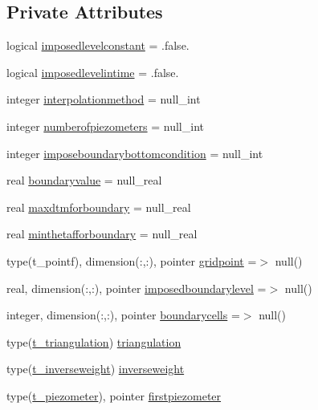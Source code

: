 \subsection*{Private Attributes}
\begin{DoxyCompactItemize}
\item 
logical \mbox{\hyperlink{structmoduleporousmedia_1_1t__boundary_a699d4d92d04b76dea647dcc070d5a6fc}{imposedlevelconstant}} = .false.
\item 
logical \mbox{\hyperlink{structmoduleporousmedia_1_1t__boundary_a0fe61c0ecad1296da9352c91b389c5e1}{imposedlevelintime}} = .false.
\item 
integer \mbox{\hyperlink{structmoduleporousmedia_1_1t__boundary_accf41c318c0bfe37d100ef60752848ed}{interpolationmethod}} = null\+\_\+int
\item 
integer \mbox{\hyperlink{structmoduleporousmedia_1_1t__boundary_ae52354fd7e4dd22f2b3089335bed0bc6}{numberofpiezometers}} = null\+\_\+int
\item 
integer \mbox{\hyperlink{structmoduleporousmedia_1_1t__boundary_a978b71da6a2eea3f28785f4fd704e63b}{imposeboundarybottomcondition}} = null\+\_\+int
\item 
real \mbox{\hyperlink{structmoduleporousmedia_1_1t__boundary_a20194e7bb77a3327381f6ca47a69c79d}{boundaryvalue}} = null\+\_\+real
\item 
real \mbox{\hyperlink{structmoduleporousmedia_1_1t__boundary_a03167e4cd5e7288ef58c6e7f25a9416c}{maxdtmforboundary}} = null\+\_\+real
\item 
real \mbox{\hyperlink{structmoduleporousmedia_1_1t__boundary_aa3333c8674347942dc59ff597debf1b6}{minthetafforboundary}} = null\+\_\+real
\item 
type(t\+\_\+pointf), dimension(\+:,\+:), pointer \mbox{\hyperlink{structmoduleporousmedia_1_1t__boundary_a75d7476bc272d97fd668e38d2ebb2651}{gridpoint}} =$>$ null()
\item 
real, dimension(\+:,\+:), pointer \mbox{\hyperlink{structmoduleporousmedia_1_1t__boundary_aa869c66f5e0f878c92939d5effa8fb7a}{imposedboundarylevel}} =$>$ null()
\item 
integer, dimension(\+:,\+:), pointer \mbox{\hyperlink{structmoduleporousmedia_1_1t__boundary_a3c8285a76a5c65d406c2d54e62bbc9aa}{boundarycells}} =$>$ null()
\item 
type(\mbox{\hyperlink{structmoduleporousmedia_1_1t__triangulation}{t\+\_\+triangulation}}) \mbox{\hyperlink{structmoduleporousmedia_1_1t__boundary_a5e2bc2b42b6d607521ce8b894878f55b}{triangulation}}
\item 
type(\mbox{\hyperlink{structmoduleporousmedia_1_1t__inverseweight}{t\+\_\+inverseweight}}) \mbox{\hyperlink{structmoduleporousmedia_1_1t__boundary_a921343b0358dc38f5f15c578b657fee3}{inverseweight}}
\item 
type(\mbox{\hyperlink{structmoduleporousmedia_1_1t__piezometer}{t\+\_\+piezometer}}), pointer \mbox{\hyperlink{structmoduleporousmedia_1_1t__boundary_a69182f8bb4595b6063471fd0c6b2586a}{firstpiezometer}}
\end{DoxyCompactItemize}


